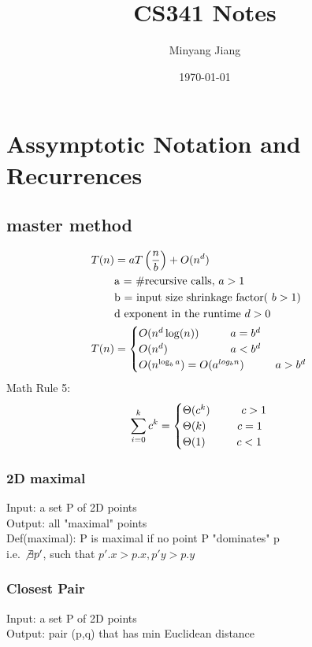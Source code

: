 \documentclass[10pt,usletter]{article}
\title{\huge CS341 Notes}
\author{Minyang Jiang}
\date{\today}
\newcommand{\NP}{\newpage \vspace*{-0.4in}}
\newcommand{\tab}[1][1cm]{\hspace*{#1}}
\begin{document}
\maketitle
\NP
\section{Assymptotic Notation and Recurrences}
\subsection{master method}
\begin{align*}
T(n)&=aT\left(\frac{n}{b}\right) +O(n^d)\\
&\text{a = \#recursive calls, }a>1\\
&\text{b = input size shrinkage factor( }b>1)\\
&\text{d exponent in the runtime } d>0\\
T(n)&=
\begin{cases}
O(n^d\log(n)) \tab  a=b^d\\
O(n^d) \tab[2cm] a < b^d\\
O(n^{\log_ba})=O(a^{log_bn})  \tab a>b^d
\end{cases}
\end{align*}
Math Rule 5: $$\sum_{i=0}^kc^k=
\begin{cases}
\Theta(c^k) \tab c>1\\
\Theta(k)	\tab c=1\\
\Theta(1)	\tab c<1
\end{cases}
$$
\subsubsection{2D maximal}
Input: a set P of 2D points\\
Output: all "maximal" points\\
Def(maximal): P is maximal if no point P "dominates" p \\
i.e. $\not \exists p'$, such that $p'.x>p.x, p'y > p.y$

\subsubsection{Closest Pair}
Input: a set P of 2D points\\
Output: pair (p,q) that has min Euclidean distance
\end{document}
